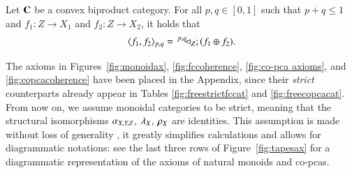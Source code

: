 \begin{lemma}\label{lemma:diagpq3} 
Let $\mathbf{C}$ be a convex biproduct category. For all  $p,q\in [0,1]$ such that $p+q\le 1$ and $f_1\colon Z\to X_1$ and $f_2\colon Z\to X_2$, it holds that
 \[\langle f_1, f_2\rangle_{p,q} =\, ^{p,q\,}\!\! \lhd_{Z}; (f_1 \oplus f_2)\text{.}\]
\end{lemma}



\begin{remark}
The axioms in Figures~\ref{fig:monoidax}, \ref{fig:fccoherence}, \ref{fig:co-pca axioms}, and \ref{fig:copcacoherence} have been placed in the Appendix, since their \emph{strict} counterparts already appear in Tables \ref{fig:freestrictfccat} and \ref{fig:freecopcacat}. From now on, we assume monoidal categories to be strict, meaning that the structural isomorphisms  $\alpha_{X,Y,Z}$, $\lambda_{X}$, $\rho_{X}$ are identities. This assumption is made without loss of generality \cite{mac_lane_categories_1978}, it greatly simplifies calculations and allows for diagrammatic notations: see the last three rows of Figure~\ref{fig:tapesax} for a diagrammatic representation of the axioms of natural monoids and co-pcas.
\end{remark}




\begin{table}[t]
\caption{Axioms for natural and coherent monoids in a strict monoidal category.}\label{fig:freestrictfccat}
\end{table}




